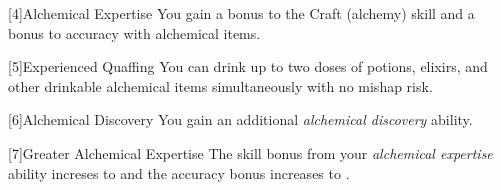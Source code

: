         [4]{Alchemical Expertise} You gain a  bonus to the Craft (alchemy) skill and a  bonus to accuracy with alchemical items.

        [5]{Experienced Quaffing} You can drink up to two doses of potions, elixirs, and other drinkable alchemical items simultaneously with no mishap risk.

        [6]{Alchemical Discovery} You gain an additional \textit{alchemical discovery} ability.

        [7]{Greater Alchemical Expertise} The skill bonus from your \textit{alchemical expertise} ability increses to  and the accuracy bonus increases to .

